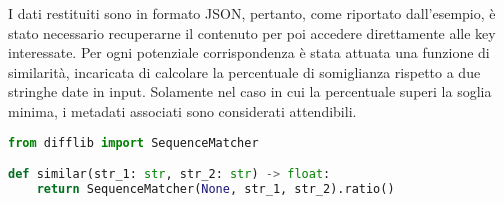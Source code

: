 I dati restituiti sono in formato JSON, pertanto, come riportato dall'esempio, è stato necessario recuperarne il contenuto per poi accedere direttamente alle key interessate. Per ogni potenziale corrispondenza è stata attuata una funzione di similarità, incaricata di calcolare la percentuale di somiglianza rispetto a due stringhe date in input. Solamente nel caso in cui la percentuale superi la soglia minima, i metadati associati sono considerati attendibili.
\begin{lstlisting}[language=python, caption=Calcolo della similarità tra due stringhe]
from difflib import SequenceMatcher

def similar(str_1: str, str_2: str) -> float:
    return SequenceMatcher(None, str_1, str_2).ratio()\end{lstlisting}